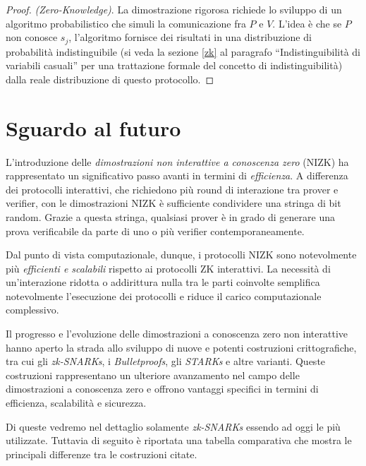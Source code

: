 \documentclass{article}
\theoremstyle{definition}
\begin{document}
\begin{proof}
    \emph{(Zero-Knowledge)}.
    La dimostrazione rigorosa richiede lo sviluppo di un algoritmo probabilistico che simuli la comunicazione fra $P$ e $V$. L'idea è che se $P$ non conosce $s_j$, l'algoritmo fornisce dei risultati in una distribuzione di probabilità indistinguibile (si veda la sezione \ref{zk} al paragrafo ``Indistinguibilità di variabili casuali'' per una trattazione formale del concetto di indistinguibilità) dalla reale distribuzione di questo protocollo. 
\end{proof}

\section{Sguardo al futuro}
L'introduzione delle \emph{dimostrazioni non interattive a conoscenza zero} (NIZK) ha rappresentato un significativo passo avanti in termini di \emph{efficienza}. A differenza dei protocolli interattivi, che richiedono più round di interazione tra prover e verifier, con le dimostrazioni NIZK è sufficiente condividere una stringa di bit random. Grazie a questa stringa, qualsiasi prover è in grado di generare una prova verificabile da parte di uno o più verifier contemporaneamente.

Dal punto di vista computazionale, dunque, i protocolli NIZK sono notevolmente più \emph{efficienti e scalabili} rispetto ai protocolli ZK interattivi. La necessità di un'interazione ridotta o addirittura nulla tra le parti coinvolte semplifica notevolmente l'esecuzione dei protocolli e riduce il carico computazionale complessivo.

Il progresso e l'evoluzione delle dimostrazioni a conoscenza zero non interattive hanno aperto la strada allo sviluppo di nuove e potenti costruzioni crittografiche, tra cui gli \emph{zk-SNARKs}, i \emph{Bulletproofs}, gli \emph{STARKs} e altre varianti. Queste costruzioni rappresentano un ulteriore avanzamento nel campo delle dimostrazioni a conoscenza zero e offrono vantaggi specifici in termini di efficienza, scalabilità e sicurezza.

Di queste vedremo nel dettaglio solamente \emph{zk-SNARKs} essendo ad oggi le più utilizzate. Tuttavia di seguito è riportata una tabella comparativa che mostra le principali differenze tra le costruzioni citate.
\end{document}
